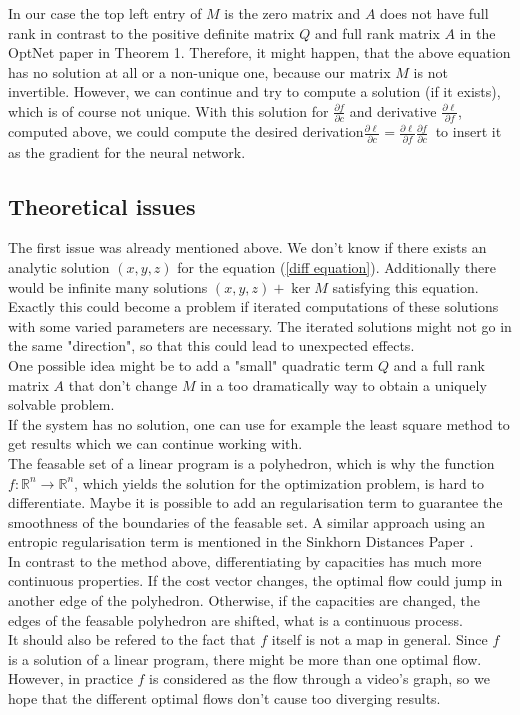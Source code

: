 \documentclass{article}
\begin{document}
{In our case the top left entry of $M$ is the zero matrix and $A$ does not have full rank in contrast to the positive definite matrix $Q$ and full rank matrix $A$ in the OptNet paper in Theorem 1. Therefore, it might happen, that the above equation has no solution at all or a non-unique one, because our matrix $M$ is not invertible. However, we can continue and try to compute a solution (if it exists), which is of course not unique. With this solution for $\frac{\partial f}{\partial c}$ and derivative $\frac{\partial \ell}{\partial f}$, computed above, we could compute the desired derivation$\frac{\partial \ell }{\partial c} = \frac{\partial \ell}{\partial f} \frac{\partial f}{\partial c}~
$ to insert it as the gradient for the neural network. 

\subsection{Theoretical issues}

The first issue was already mentioned above. We don't know if there exists an analytic solution $(x,y,z)$ for the equation (\ref*{diff equation}). Additionally there would be infinite many solutions $(x,y,z)+ \ker M$ satisfying this equation. Exactly this could become a problem if iterated computations of these solutions with some varied parameters are necessary. The iterated solutions might not go in the same "direction", so that this could lead to unexpected effects. \\
One possible idea might be to add a "small" quadratic term $Q$ and a full rank matrix $A$ that don't change $M$ in a too dramatically way to obtain a uniquely solvable problem.\\
If the system has no solution, one can use for example the least square method to get results which we can continue working with.\\
The feasable set of a linear program is a polyhedron, which is why the function $f:\mathbb R^n \rightarrow \mathbb R^n$, which yields the solution for the optimization problem, is hard to differentiate. Maybe it is possible to add an regularisation term to guarantee the smoothness of the boundaries of the feasable set. A similar approach using an entropic regularisation term is mentioned in the Sinkhorn Distances Paper \cite{Sink67}. \\
In contrast to the method above, differentiating by capacities has much more continuous properties. If the cost vector changes, the optimal flow could jump in another edge of the polyhedron. Otherwise, if the capacities are changed, the edges of the feasable polyhedron are shifted, what is a continuous process.\\
It should also be refered to the fact that $f$ itself is not a map in general. Since $f$ is a solution of a linear program, there might be more than one optimal flow. However, in practice $f$ is considered as the flow through a video's graph, so we hope that the different optimal flows don't cause too diverging results. 



}
\end{document}
